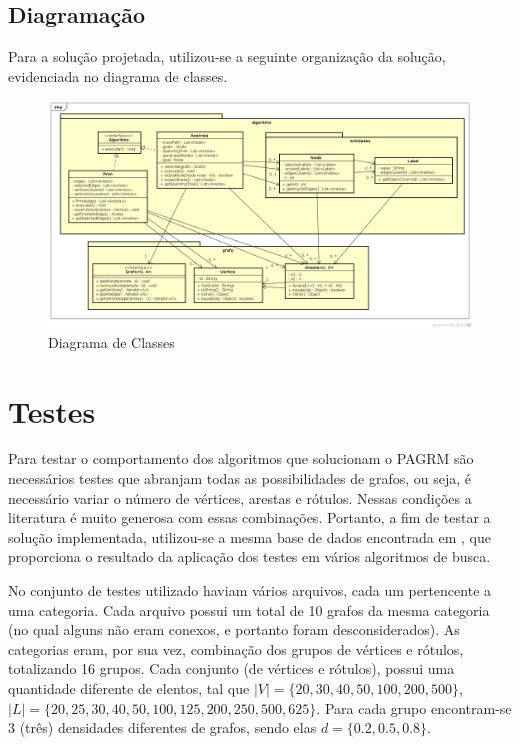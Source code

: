 \documentclass[12pt]{article}
\begin{document}
	\subsection{Diagramação}\label{sec:diagramacao}

		Para a solução projetada, utilizou-se a seguinte organização da solução, evidenciada no diagrama de classes.

		\begin{landscape}
		\centering
		\begin{figure}[p]
		\includegraphics[width=1.4\textwidth]{ClassDiagram.png}
		\caption{Diagrama de Classes}
		\label{fig:classDiagram}
		\end{figure}
		\end{landscape}
		\restoregeometry

\section{Testes}\label{sec:testes}
	
	Para testar o comportamento dos algoritmos que solucionam o PAGRM são necessários testes que abranjam todas as possibilidades de grafos, ou seja, é necessário variar o número de vértices, arestas e rótulos. Nessas condições a literatura é muito generosa com essas combinações. Portanto, a fim de testar a solução implementada, utilizou-se a mesma base de dados encontrada em \cite{cerulli:2005}, que proporciona o resultado da aplicação dos testes em vários algoritmos de busca.

	No conjunto de testes utilizado haviam vários arquivos, cada um pertencente a uma categoria. Cada arquivo possui um total de 10 grafos da mesma categoria (no qual alguns não eram conexos, e portanto foram desconsiderados). As categorias eram, por sua vez, combinação dos grupos de vértices e rótulos, totalizando 16 grupos. Cada conjunto (de vértices e rótulos), possui uma quantidade diferente de elentos, tal que $|V| = \{20, 30, 40, 50, 100, 200, 500\}$, $|L| = \{20, 25, 30, 40, 50, 100, 125, 200, 250, 500, 625\}$. Para cada grupo encontram-se 3 (três) densidades diferentes de grafos, sendo elas $d = \{0.2, 0.5, 0.8\}$.
\end{document}
